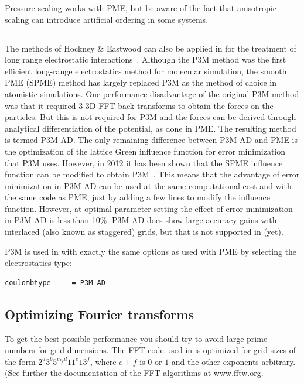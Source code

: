 Pressure scaling works with PME, but be aware of the fact that
anisotropic scaling can introduce artificial ordering in some systems.

\subsection{}
\label{sec:pppm}
The  methods of
Hockney \& Eastwood can also be applied in {\gromacs} for the
treatment of long range electrostatic interactions~\cite{Hockney81}.
Although the P3M method was the first efficient long-range electrostatics
method for molecular simulation, the smooth PME (SPME) method has largely
replaced P3M as the method of choice in atomistic simulations. One performance
disadvantage of the original P3M method was that it required 3 3D-FFT
back transforms to obtain the forces on the particles. But this is not
required for P3M and the forces can be derived through analytical differentiation
of the potential, as done in PME. The resulting method is termed P3M-AD.
The only remaining difference between P3M-AD and PME is the optimization
of the lattice Green influence function for error minimization that P3M uses.
However, in 2012 it has been shown that the SPME influence function can be
modified to obtain P3M~\cite{Ballenegger2012}.
This means that the advantage of error minimization in P3M-AD can be used
at the same computational cost and with the same code as PME,
just by adding a few lines to modify the influence function.
However, at optimal parameter setting the effect of error minimization
in P3M-AD is less than 10\%. P3M-AD does show large accuracy gains with
interlaced (also known as staggered) grids, but that is not supported
in {\gromacs} (yet).

P3M is used in {\gromacs} with exactly the same options as used with PME
by selecting the electrostatics type:
\begin{verbatim}
coulombtype     = P3M-AD
\end{verbatim}

\subsection{Optimizing Fourier transforms}
To get the best possible performance you should try to avoid large
prime numbers for grid dimensions.
The FFT code used in {\gromacs} is
optimized for grid sizes of the form $2^a 3^b 5^c 7^d 11^e 13^f$,
where $e+f$ is $0$ or $1$ and the other exponents arbitrary. (See
further the documentation of the FFT algorithms at 
\href{http://www.fftw.org}{www.fftw.org}.


